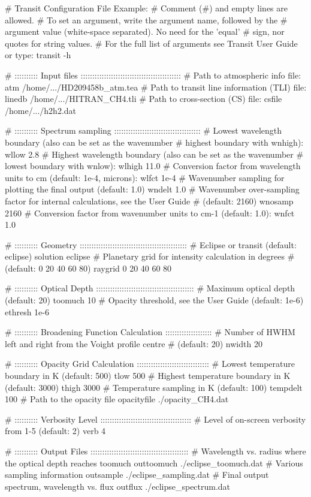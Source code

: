 \documentclass[letterpaper, 12pt]{article}
\begin{document}
\begin{plain}
# Transit Configuration File Example:
# Comment (#) and empty lines are allowed.
# To set an argument, write the argument name, followed by the
#  argument value (white-space separated).  No need for the 'equal'
#  sign, nor quotes for string values.
# For the full list of arguments see Transit User Guide or type: transit -h

# ::::::::::  Input files  :::::::::::::::::::::::::::::::::::::::::::
# Path to atmospheric info file:
atm    /home/.../HD209458b_atm.tea
# Path to transit line information (TLI) file:
linedb /home/.../HITRAN_CH4.tli
# Path to cross-section (CS) file:
csfile /home/.../h2h2.dat

# ::::::::::  Spectrum sampling  :::::::::::::::::::::::::::::::::::::
# Lowest wavelength boundary (also can be set as the wavenumber
#   highest boundary with wnhigh):
wllow   2.8
# Highest wavelength boundary (also can be set as the wavenumber
#   lowest boundary with wnlow):
wlhigh 11.0
# Conversion factor from wavelength units to cm (default: 1e-4, microns):
wlfct  1e-4
# Wavenumber sampling for plotting the final output (default: 1.0) 
wndelt  1.0
# Wavenumber over-sampling factor for internal calculations, see the User Guide
#   (default: 2160)
wnosamp 2160
# Conversion factor from wavenumber units to cm-1 (default: 1.0):
wnfct   1.0

# ::::::::::  Geometry  ::::::::::::::::::::::::::::::::::::::::::::::
# Eclipse or transit (default: eclipse)
solution eclipse
# Planetary grid for intensity calculation in degrees
#   (default: 0 20 40 60 80)
raygrid 0 20 40 60 80

# ::::::::::  Optical Depth ::::::::::::::::::::::::::::::::::::::::::
# Maximum optical depth (default: 20)
toomuch 10
# Opacity threshold, see the User Guide (default: 1e-6)
ethresh 1e-6

# ::::::::::  Broadening Function Calculation  ::::::::::::::::::::
# Number of HWHM left and right from the Voight profile centre
#    (default: 20)
nwidth 20

# ::::::::::  Opacity Grid Calculation :::::::::::::::::::::::::::::::
# Lowest temperature boundary in K (default: 500)
tlow        500
# Highest temperature boundary in K (default: 3000)
thigh      3000
# Temperature sampling in K (default: 100)
tempdelt    100
# Path to the opacity file
opacityfile  ./opacity_CH4.dat

# ::::::::::  Verbosity Level  :::::::::::::::::::::::::::::::::::::::
# Level of on-screen verbosity from 1-5 (default: 2)
verb 4

# ::::::::::  Output Files  ::::::::::::::::::::::::::::::::::::::::::
# Wavelength vs. radius where the optical depth reaches toomuch
outtoomuch ./eclipse_toomuch.dat
# Various sampling information
outsample  ./eclipse_sampling.dat
# Final output spectrum, wavelength vs. flux
outflux    ./eclipse_spectrum.dat
\end{plain}
\end{document}

